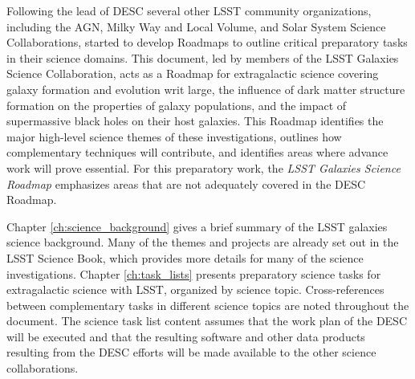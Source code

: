{Following the lead of DESC several other LSST community organizations, 
including the AGN, Milky Way and Local Volume, and Solar System Science
Collaborations,
started to develop Roadmaps to outline critical preparatory tasks in
their science domains.
This document, led by members of the LSST Galaxies Science Collaboration, 
acts as a Roadmap for extragalactic science covering
galaxy formation and evolution writ large, the influence of dark matter structure
formation on the properties of galaxy populations, and the impact of supermassive
black holes on their host galaxies.
This Roadmap identifies the major high-level
science themes of these investigations, outlines how complementary techniques
will contribute, and identifies areas where advance work will prove essential. For this
preparatory work, the {\it LSST Galaxies Science Roadmap} emphasizes areas that are not adequately 
covered in the DESC Roadmap. 

Chapter \ref{ch:science_background} gives a brief summary of the LSST galaxies science background.
Many of the themes and projects are already set out in the LSST Science Book, 
which provides more details for many of the science investigations. 
Chapter \ref{ch:task_lists} presents preparatory science tasks for 
extragalactic science with LSST, organized by science topic.
Cross-references between complementary tasks in different science topics are
noted throughout the document.
The science task list content assumes that the work plan of the DESC will be executed
and that the resulting software and other data products resulting from the DESC
efforts will be made available to the other science collaborations.
}
\let\cleardoublepage\clearpage

